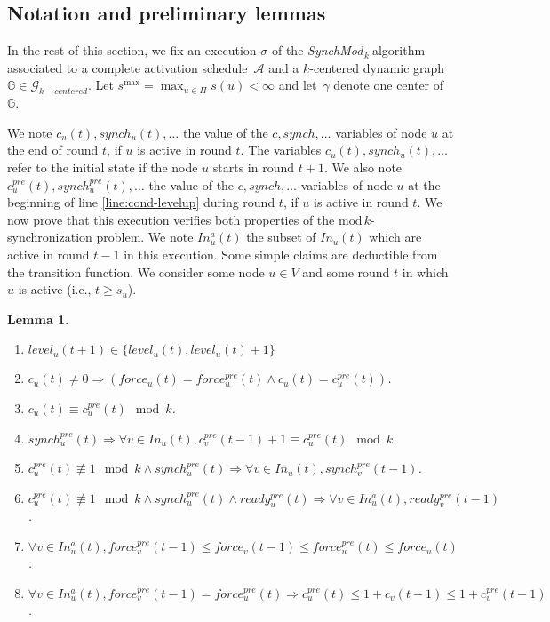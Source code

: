 \documentclass[11pt,letterpaper]{article}
\newtheorem{lem}[thm]{Lemma}
\newcommand{\cent}{\gamma}
\newcommand{\SM}{{\em SynchMod}$_{\,k}\ $}
\begin{document}
\subsection{Notation and preliminary lemmas}

In the rest of this section, we fix an execution $\sigma$ of the \SM algorithm associated to a complete activation
schedule~$\mathcal{A}$ and a $k$-centered dynamic graph~$\mathds{G} \in \mathcal{G}_{k-centered}$. 
Let $s^{\max} = \max_{u \in \Pi} s(u) < \infty$ and let~$\cent$ denote one center of~$\mathds{G}$.

We note $c_u(t), synch_u(t), \dots$ the value of the $c, synch, \dots$ variables of node $u$ at the end of round $t$, if $u$ is active in round $t$.
The variables $c_u(t), synch_u(t), \dots$ refer to the initial state if the node $u$ starts in round $t+1$.
We also note $c^{pre}_u(t), synch^{pre}_u(t), \dots$ the value of the $c, synch, \dots$ variables
of node $u$ at the beginning of line \ref{line:cond-levelup} during round $t$, if $u$ is active in round $t$.
We now prove that this execution verifies both properties of the $\mathrm{mod}\,k$-synchronization problem.
We note $In_u^a(t)$ the subset of $In_u(t)$ which are active in round $t-1$ in this execution.
Some simple claims are deductible from the transition function.
We consider some node $u \in V$ and some round $t$ in which $u$ is active (i.e., $t \geq s_u$).
\begin{lem} \hfill
	\begin{enumerate}[label=\upshape(\alph*),ref=\thethm (\alph*)]
		\item\label{lem:cl1} $level_u(t+1) \in \{level_u(t), level_u(t)+1\}$
		\item\label{lem:cl2b}$c_u(t) \neq 0 \Rightarrow (force_u(t) = force_u^{pre}(t) \wedge c_u(t) = c_u^{pre}(t))$.
		\item\label{lem:cl2} $c_u(t) \equiv c_u^{pre}(t) \mod k$.
		\item\label{lem:cl3} $synch_u^{pre}(t) \Rightarrow \forall v \in In_u(t), c_v^{pre}(t-1) + 1 \equiv c_u^{pre}(t) \mod k$.
		\item\label{lem:cl4} $c_u^{pre}(t) \not\equiv 1 \mod k \wedge synch_u^{pre}(t) \Rightarrow \forall v \in In_u(t), synch_v^{pre}(t-1)$.
		\item\label{lem:cl5} $c_u^{pre}(t) \not\equiv 1 \mod k \wedge synch_u^{pre}(t) \wedge ready_u^{pre}(t) \Rightarrow \forall v \in In_u^a(t), ready_v^{pre}(t-1)$.
		\item\label{lem:cl6} $\forall v \in In_u^a(t), force_v^{pre}(t-1) \leq force_v(t-1) \leq force_u^{pre}(t) \leq force_u(t)$.
		\item\label{lem:cl7} $\forall v \in In_u^a(t), force_v^{pre}(t-1) = force_u^{pre}(t) \Rightarrow c_u^{pre}(t) \leq 1+c_v(t-1) \leq 1+c_v^{pre}(t-1)$.
	\end{enumerate}
\end{lem}
\end{document}
